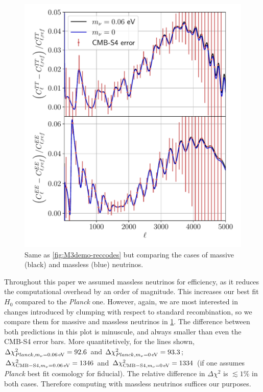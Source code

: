 \begin{figure}[ht!]
\includegraphics[width=\columnwidth]{img/M3demo-neutrinos.pdf}
\caption[Impact of massive neutrinos on CMB power spectrum multipoles]{Same as \cref{fig:M3demo-reccodes} but comparing the cases of massive (black) and massless (blue) neutrinos.}
\label{fig:M3demo-neutrinos}
\end{figure}

Throughout this paper we assumed massless neutrinos for efficiency, as it reduces the computational overhead by an order of magnitude. 
This increases our best fit $H_0$ compared to the {\it Planck} one.
However, again, we are most interested in changes introduced by clumping with respect to standard recombination, so we compare them for massive and massless neutrinos in \cref{fig:M3demo-neutrinos}.
The difference between both predictions in this plot is minuscule, and always smaller than even the CMB-S4 error bars.
More quantitetively, for the lines shown, $\Delta\chi^2_{Planck,m_\nu=0.06\,\rm eV}=92.6$ and $\Delta\chi^2_{Planck,m_\nu=0\,\rm eV}=93.3$; $\Delta\chi^2_{{\rm CMB-S4},m_\nu=0.06\,\rm eV}=1346$ and $\Delta\chi^2_{{\rm CMB-S4},m_\nu=0\,\rm eV}=1334$ (if one assumes {\it Planck} best fit cosmology for fiducial).
The relative difference in $\Delta\chi^2$ is $\lesssim 1\%$ in both cases.
Therefore computing with massless neutrinos suffices our purposes.

